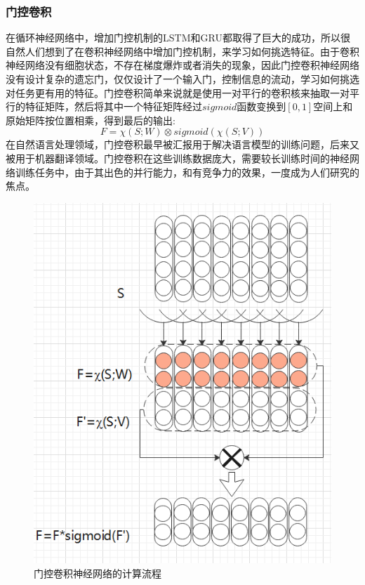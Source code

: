 \documentclass[twoside,a4paper,12pt]{book}%
\begin{document}
\subsubsection{门控卷积}
在循环神经网络中，增加门控机制的\gls{LSTM}和\gls{GRU}都取得了巨大的成功，所以很自然人们想到了在卷积神经网络中增加门控机制，来学习如何挑选特征。由于卷积神经网络没有细胞状态，不存在梯度爆炸或者消失的现象，因此门控卷积神经网络没有设计复杂的遗忘门，仅仅设计了一个输入门，控制信息的流动，学习如何挑选对任务更有用的特征。门控卷积简单来说就是使用一对平行的卷积核来抽取一对平行的特征矩阵，然后将其中一个特征矩阵经过$sigmoid$函数变换到$[0,1]$空间上和原始矩阵按位置相乘，得到最后的输出:
$$
F=\mathbb{\chi}(S;W) \otimes sigmoid(\mathbb{\chi}(S;V))
$$
在自然语言处理领域，门控卷积最早被汇报用于解决语言模型的训练问题，后来又被用于机器翻译领域。门控卷积在这些训练数据庞大，需要较长训练时间的神经网络训练任务中，由于其出色的并行能力，和有竞争力的效果，一度成为人们研究的焦点。
\begin{figure}[htbp]
\begin{center}
\includegraphics[width=5.0in]{figures/gcnn1.png}
\caption{门控卷积神经网络的计算流程}
\label{fig:gcnn1}
\end{center}
\end{figure}
\end{document}

